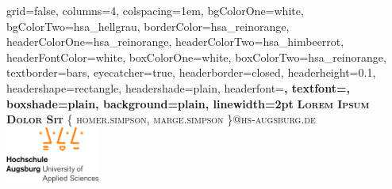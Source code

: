 \documentclass[landscape,final,a4paper,fontscale=0.75]{baposter}
\begin{document}



\begin{poster}%
  {
  grid=false,
  columns=4,
  colspacing=1em,
  bgColorOne=white,
  bgColorTwo=hsa_hellgrau,
  borderColor=hsa_reinorange,
  headerColorOne=hsa_reinorange,
  headerColorTwo=hsa_himbeerrot,
  headerFontColor=white,
  boxColorOne=white,
  boxColorTwo=hsa_reinorange,
  textborder=bars,
  eyecatcher=true,
  headerborder=closed,
  headerheight=0.1\textheight,
  headershape=rectangle,
  headershade=plain,
  headerfont=\bf\sc, %
  textfont={\small\sf\setlength{\parindent}{1.5em}},
  boxshade=plain,
  background=plain,
  linewidth=2pt
  }
  {
  } 
  {\bf\textsc{Lorem Ipsum Dolor Sit}\vspace{.333em}}
  {\textsc{\{ homer.simpson, marge.simpson \}@hs-augsburg.de}}
  {%
    \includegraphics[height=5em]{images/hsa_logo_normal.jpg}
  }	


\end{poster}
\end{document}
